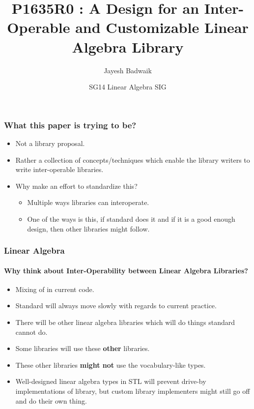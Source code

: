 \documentclass[dvipsnames,10pt]{jbeamer}
\title[P1635R0]{P1635R0 : A Design for an Inter-Operable and Customizable Linear
Algebra Library}
\author{Jayesh Badwaik}
\date{SG14 Linear Algebra SIG}
\begin{document}
\maketitle

\begin{frame}
  \frametitle{What this paper is trying to be?}

  \begin{itemize}
    \item Not a library proposal.
    \item Rather a collection of concepts/techniques which enable the library
      writers to write inter-operable libraries.
    \item Why make an effort to standardize this?

      \begin{itemize}
        \item Multiple ways libraries can interoperate.
        \item One of the ways is this, if standard does it and if it is a good
          enough design, then other libraries might follow.
      \end{itemize}
  \end{itemize}
\end{frame}

\begin{frame}
  \frametitle{Linear Algebra}
  \framesubtitle{Why think about Inter-Operability between Linear Algebra
  Libraries?}

  \vspace{0.5cm}
  \begin{itemize}
    \item Mixing of  in current code.
    \item Standard will always move slowly with regards to current practice.
    \item There will be other linear algebra libraries which will do things
      standard cannot do.
    \item Some libraries will use these \textbf{other} libraries.
    \item These other libraries \textbf{might not} use the vocabulary-like
      types.
    \item Well-designed linear algebra types in STL will prevent drive-by
      implementations of library, but custom library implementers might still go
      off and do their own thing.
  \end{itemize}
\end{frame}
\end{document}
